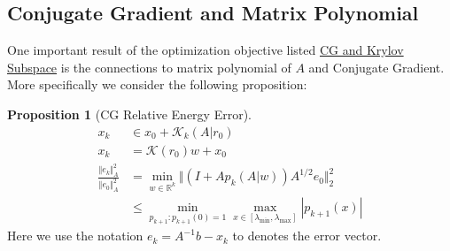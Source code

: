 \documentclass[]{article}
\theoremstyle{definition}
\newtheorem{prop}{Proposition}[section]  %
\begin{document}
    \subsection{Conjugate Gradient and Matrix Polynomial}
        One important result of the optimization objective listed \hyperref[theorem:CG_and_Krylov_Subspace]{CG and Krylov Subspace} is the connections to matrix polynomial of $A$ and Conjugate Gradient. More specifically we consider the following proposition: 
        \begin{prop}[CG Relative Energy Error]\label{prop:CG_Relative_Energy Error}
            \begin{align}
                x_k &\in x_0 + \mathcal K_k(A|r_0)
                \\
                x_k &= \mathcal{K}(r_0)w + x_0
                \\
                \frac{\Vert e_k\Vert_A^2}{\Vert e_0\Vert_A^2}
                &= 
                \min_{w\in \mathbb R^k} 
                \Vert
                    (I + Ap_k(A|w))A^{1/2}e_0
                \Vert_2^2 
                \\
                &\le
                \min_{p_{k + 1}: p_{k + 1}(0) = 1}\max_{x\in [\lambda_{\text{min}}, \lambda_{\text{max}}]} |p_{k + 1}(x)|
            \end{align}
            Here we use the notation $e_k = A^{-1}b - x_k$ to denotes the error vector. 
        \end{prop}
\end{document}
